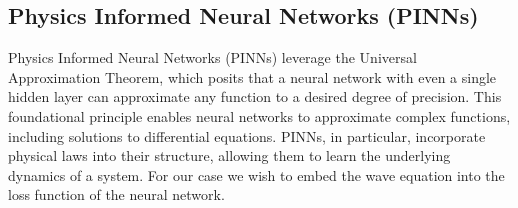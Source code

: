 \documentclass[twoside,11pt]{report}
\begin{document}
\subsection{Physics Informed Neural Networks (PINNs)}
\label{sec:DNN}
    
    Physics Informed Neural Networks (PINNs) leverage the Universal Approximation Theorem, which posits 
    that a neural network with even a single hidden layer can approximate any function to a desired degree 
    of precision. This foundational principle enables neural networks to approximate complex functions, including 
    solutions to differential equations.
    PINNs, in particular, incorporate physical laws into their structure, allowing them to learn the underlying 
    dynamics of a system. For our case we wish to embed the wave equation into the loss function of the neural network.
\end{document}
